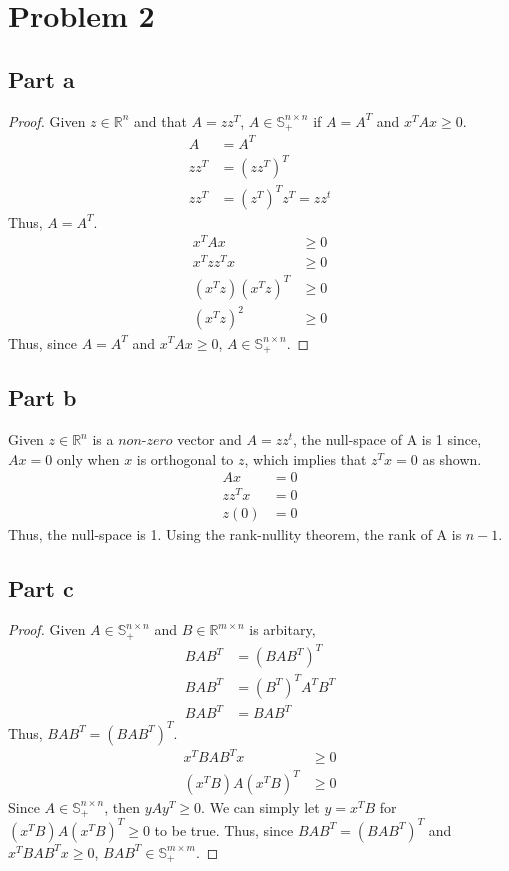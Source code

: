 \documentclass[11pt,a4paper,titlepage]{article}
\newcommand{\R}{\mathbb{R}}
\begin{document}
\section{Problem 2}{
\subsection{Part a}{
\begin{proof}
Given $z\in\R^n$ and that $A=zz^T$, $A\in\mathbb{S}^{n \times n}_+$ if $A=A^T$ and $x^TAx\geq0$.
\begin{align*}
A &= A^T
\\zz^T &= (zz^T)^T
\\zz^T &= (z^T)^Tz^T = zz^t
\end{align*}
Thus, $A = A^T$.
\begin{align*}
x^TAx&\geq0
\\x^Tzz^Tx&\geq0
\\(x^Tz)(x^Tz)^T&\geq0
\\(x^Tz)^2&\geq0
\end{align*}
Thus, since $A=A^T$ and $x^TAx\geq0$, $A\in\mathbb{S}^{n \times n}_+$.
\end{proof}
}\label{prob:2a}
\subsection{Part b}{
Given $z\in\R^n$ is a $\textit{non-zero}$ vector and $A=zz^t$, the null-space of A is 1 since, $Ax=0$ only when $x$ is orthogonal to $z$, which implies that $z^Tx=0$ as shown.
\begin{align*}
	Ax&=0
  \\zz^Tx&=0
  \\z(0)&=0
\end{align*}
Thus, the null-space is 1. Using the rank-nullity theorem, the rank of A is $n-1$.
}\label{prob:2b}
\subsection{Part c}{
\begin{proof}
Given $A\in\mathbb{S}^{n \times n}_+$ and $B\in\R^{m\times n}$ is arbitary, 
\begin{align*}
	BAB^T &= (BAB^T)^T
  \\BAB^T &= (B^T)^TA^TB^T
  \\BAB^T &= BAB^T
\end{align*}
Thus, $BAB^T = (BAB^T)^T$.
\begin{align*}
	x^TBAB^Tx&\geq0
  \\(x^TB)A(x^TB)^T&\geq0
\end{align*}
Since $A\in\mathbb{S}^{n \times n}_+$, then $yAy^T\geq0$. We can simply let $y=x^TB$ for $(x^TB)A(x^TB)^T\geq0$ to be true. Thus, since $BAB^T = (BAB^T)^T$ and $x^TBAB^Tx\geq0$, $BAB^T\in\mathbb{S}^{m \times m}_+$.
\end{proof}
}\label{prob:2c}
}\label{problem 2}
\end{document}
